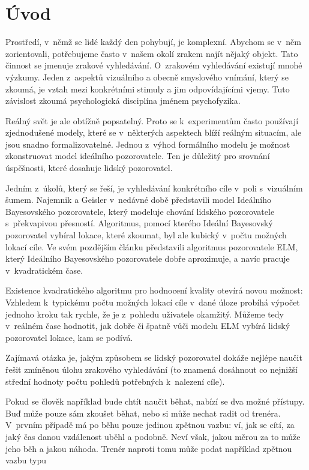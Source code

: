 \chapter*{Úvod}

Prostředí, v~němž se lidé každý den pohybují, je komplexní. Abychom se v~něm
zorientovali, potřebujeme často v~našem okolí zrakem najít nějaký objekt. Tato
činnost se jmenuje zrakové vyhledávání. O~zrakovém vyhledávání existují mnohé
výzkumy. Jeden z~aspektů vizuálního a obecně smyslového vnímání, který se
zkoumá, je vztah mezi konkrétními stimuly a jim odpovídajícími vjemy. Tuto
závislost zkoumá psychologická disciplína jménem psychofyzika.

Reálný svět je ale obtížně popsatelný. Proto se k~experimentům často
používají zjednodušené modely, které se v~některých aspektech blíží reálným
situacím, ale jsou snadno formalizovatelné. Jednou z~výhod formálního modelu je
možnost zkonstruovat model ideálního pozorovatele. Ten je důležitý pro srovnání
úspěšnosti, které dosahuje lidský pozorovatel.

Jedním z~úkolů, který se řeší, je vyhledávání konkrétního cíle v~poli s~vizuálním šumem.
Najemnik a Geisler \citeyearpar{Najemnik05} v~nedávné době představili model
Ideálního Bayesovského pozorovatele, který modeluje chování lidského
pozorovatele s~překvapivou přesností. Algoritmus, pomocí kterého Ideální
Bayesovský pozorovatel vybíral lokace, které zkoumat, byl ale kubický v~počtu
možných lokací cíle. Ve svém pozdějším článku \citep{Najemnik09} 
představili algoritmus pozorovatele ELM, který Ideálního Bayesovského pozorovatele dobře
aproximuje, a navíc pracuje v~kvadratickém čase.

Existence kvadratického algoritmu pro hodnocení kvality otevírá novou možnost:
Vzhledem k~typickému počtu možných lokací cíle v~dané úloze probíhá výpočet jednoho kroku
tak rychle, že je z~pohledu uživatele okamžitý. Můžeme tedy v~reálném
čase hodnotit, jak dobře či špatně vůči modelu ELM vybírá lidský pozorovatel
lokace, kam se podívá.

Zajímavá otázka je, jakým způsobem se lidský pozorovatel dokáže nejlépe naučit
řešit zmíněnou úlohu zrakového vyhledávání (to znamená dosáhnout co nejnižší
střední hodnoty počtu pohledů potřebných k~nalezení cíle).

Pokud se člověk například bude chtít naučit běhat, nabízí se dva možné přístupy.
Buď může pouze sám zkoušet běhat, nebo si může nechat radit od trenéra. V~prvním
případě má po běhu pouze jedinou zpětnou vazbu: ví, jak se cítí, za jaký čas
danou vzdálenost uběhl a podobně. Neví však, jakou měrou za to může jeho běh a 
jakou náhoda. Trenér naproti tomu může podat například zpětnou vazbu typu 

